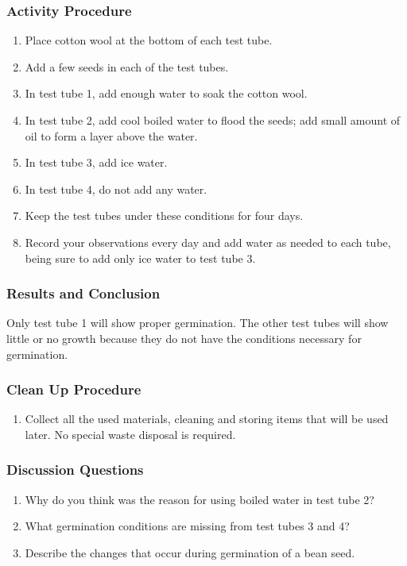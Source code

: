 \subsubsection*{Activity Procedure}
\begin{enumerate}
\item{Place cotton wool at the bottom of each test tube.}
\item{Add a few seeds in each of the test tubes.}
\item{In test tube 1, add enough water to soak the cotton wool.}
\item{In test tube 2, add cool boiled water to flood the seeds; add small amount of oil to form a layer above the water.}
\item{In test tube 3, add ice water.}
\item{In test tube 4, do not add any water.}
\item{Keep the test tubes under these conditions for four days.}
\item{Record your observations every day and add water as needed to each tube, being sure to add only ice water to test tube 3.}
\end{enumerate}

\subsubsection*{Results and Conclusion}
Only test tube 1 will show proper germination. The other test tubes will show little or no growth because they do not have the conditions necessary for germination.

\subsubsection*{Clean Up Procedure}
\begin{enumerate}
\item{Collect all the used materials, cleaning and storing items that will be used later. No special waste disposal is required.}
\end{enumerate}

\subsubsection*{Discussion Questions}
\begin{enumerate}
\item{Why do you think was the reason for using boiled water in test tube 2?}
\item{What germination conditions are missing from test tubes 3 and 4?}
\item{Describe the changes that occur during germination of a bean seed.}
\end{enumerate}

